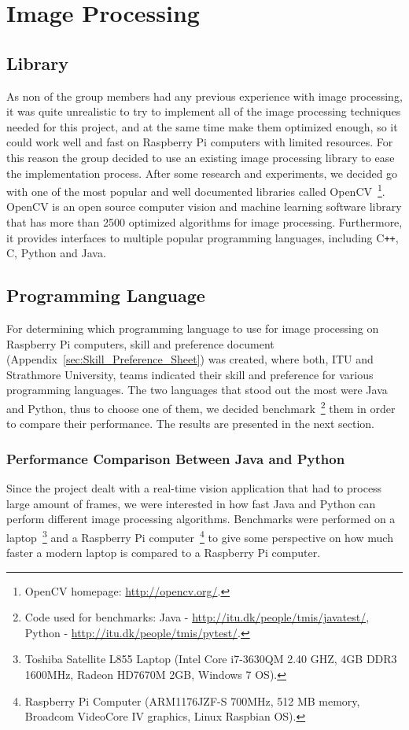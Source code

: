 \section{Image Processing}


\subsection{Library}
As non of the group members had any previous experience with image processing, it was quite unrealistic to try to implement all of the image processing techniques needed for this project, and at the same time make them optimized enough, so it could work well and fast on Raspberry Pi computers with limited resources. For this reason the group decided to use an existing image processing library to ease the implementation process. After some research and experiments, we decided go with one of the most popular and well documented libraries called OpenCV~\footnote{OpenCV homepage: \url{http://opencv.org/}.}. OpenCV is an open source computer vision and machine learning software library that has more than 2500 optimized algorithms for image processing. Furthermore, it provides interfaces to multiple popular programming languages, including C\texttt{++}, C, Python and Java.

\subsection{Programming Language}
For determining which programming language to use for image processing on Raspberry Pi computers, skill and preference document (Appendix~\ref{sec:Skill_Preference_Sheet}) was created, where both, ITU and Strathmore University, teams indicated their skill and preference for various programming languages. The two languages that stood out the most were Java and Python, thus to choose one of them, we decided benchmark~\footnote{Code used for benchmarks: Java - \url{http://itu.dk/people/tmis/javatest/}, Python - \url{http://itu.dk/people/tmis/pytest/}.} them in order to compare their performance. The results are presented in the next section.

\subsubsection{Performance Comparison Between Java and Python}
Since the project dealt with a real-time vision application that had to process large amount of frames, we were interested in how fast Java and Python can perform different image processing algorithms. Benchmarks were performed on a laptop~\footnote{Toshiba Satellite L855 Laptop (Intel Core i7-3630QM 2.40 GHZ, 4GB DDR3 1600MHz, Radeon HD7670M 2GB, Windows 7 OS).} and a Raspberry Pi computer~\footnote{Raspberry Pi Computer (ARM1176JZF-S 700MHz, 512 MB memory, Broadcom VideoCore IV graphics, Linux Raspbian OS).} to give some perspective on how much faster a modern laptop is compared to a Raspberry Pi computer.

